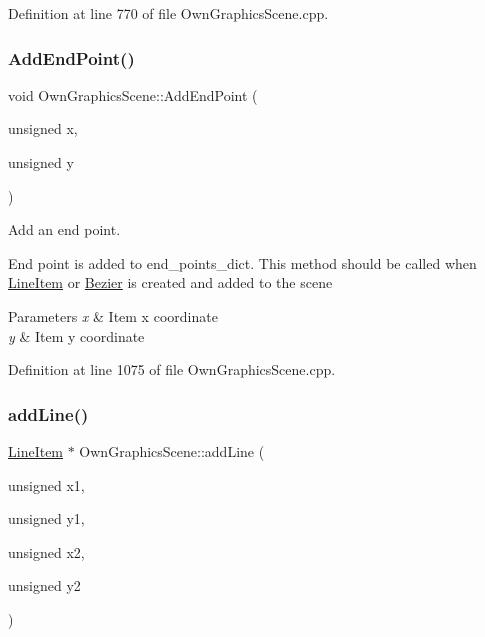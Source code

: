 Definition at line 770 of file Own\+Graphics\+Scene.\+cpp.

\mbox{\label{classOwnGraphicsScene_a64ce3afc4e535576fedbfe3f172cea0d}} 
\subsubsection{\texorpdfstring{Add\+End\+Point()}{AddEndPoint()}}
{\footnotesize\ttfamily void Own\+Graphics\+Scene\+::\+Add\+End\+Point (\begin{DoxyParamCaption}\item[{unsigned}]{x,  }\item[{unsigned}]{y }\end{DoxyParamCaption})}



Add an end point. 

End point is added to end\+\_\+points\+\_\+dict. This method should be called when \mbox{\hyperlink{classLineItem}{Line\+Item}} or \mbox{\hyperlink{classBezier}{Bezier}} is created and added to the scene 
\begin{DoxyParams}{Parameters}
{\em x} & Item x coordinate \\
\hline
{\em y} & Item y coordinate \\
\hline
\end{DoxyParams}


Definition at line 1075 of file Own\+Graphics\+Scene.\+cpp.

\mbox{\label{classOwnGraphicsScene_a4251b836ee575083f4eeaa73254723f4}} 
\subsubsection{\texorpdfstring{add\+Line()}{addLine()}}
{\footnotesize\ttfamily \mbox{\hyperlink{classLineItem}{Line\+Item}} $\ast$ Own\+Graphics\+Scene\+::add\+Line (\begin{DoxyParamCaption}\item[{unsigned}]{x1,  }\item[{unsigned}]{y1,  }\item[{unsigned}]{x2,  }\item[{unsigned}]{y2 }\end{DoxyParamCaption})}



